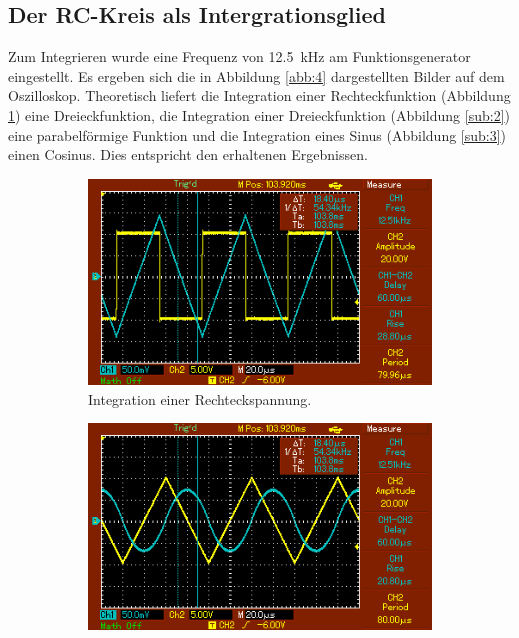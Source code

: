 \subsection{Der RC-Kreis als Intergrationsglied}
Zum Integrieren wurde eine Frequenz von \SI{12.5}{\kilo\hertz} am Funktionsgenerator
eingestellt. Es ergeben sich die in Abbildung \ref{abb:4} dargestellten Bilder auf
dem Oszilloskop. Theoretisch liefert die Integration einer Rechteckfunktion (Abbildung \ref{sub:1}) eine
Dreieckfunktion, die Integration einer Dreieckfunktion (Abbildung \ref{sub:2}) eine parabelförmige Funktion
und die Integration eines Sinus (Abbildung \ref{sub:3}) einen Cosinus. Dies entspricht den erhaltenen Ergebnissen.
\begin{figure}
  \begin{subfigure}{0.49\textwidth}
  \centering
    \includegraphics[width=\textwidth]{rechteck.png}
    \qquad
    \caption{Integration einer Rechteckspannung.}
    \label{sub:1}
  \end{subfigure}
  \begin{subfigure}{0.49\textwidth}
  \centering
    \includegraphics[width=\textwidth]{dreieck.png}

\end{subfigure}
\end{figure}
